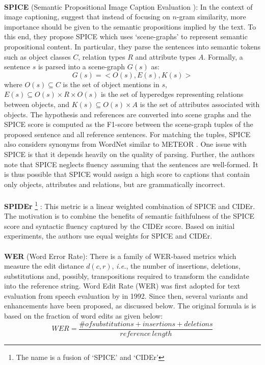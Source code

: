 \\
\textbf{SPICE} (Semantic Propositional Image Caption Evaluation  ): In the context of image captioning,  suggest that instead of focusing on $n$-gram similarity, more importance should be given to the semantic propositions implied by the text. To this end, they propose SPICE which uses `scene-graphs' to represent semantic propositional content. In particular, they parse the sentences into semantic tokens such as object classes $C$, relation types $R$ and attribute types $A$. Formally, a sentence $s$ is parsed into a scene-graph $G(s)$ as: 
$$ G(s) = <O(s), E(s), K(s)>$$
where $O(s) \subseteq C$ is the set of object mentions in $s$, $E(s) \subseteq O(s) \times R \times O(s)$ is the set of hyperedges representing relations between objects, and $K(s)\subseteq O(s) \times A$ is the set of attributes associated with objects. The hypothesis and references are converted into scene graphs and the SPICE score is computed as the F1-score between the scene-graph tuples of the proposed sentence and all reference sentences. For matching the tuples, SPICE also considers synonyms from WordNet similar to METEOR . One issue with SPICE is that it depends heavily on the quality of parsing. Further, the authors note that SPICE neglects fluency assuming that the sentences are well-formed. It is thus possible that SPICE would assign a high score to captions that contain only objects, attributes and relations, but are grammatically incorrect.\\
\\
\textbf{SPIDEr}  \footnote{The name is a fusion of `SPICE' and `CIDEr'} : This metric is a linear weighted combination of SPICE and CIDEr. The motivation is to combine the benefits of semantic faithfulness of the SPICE score and syntactic fluency captured by the CIDEr score. Based on initial experiments, the authors use equal weights for SPICE and CIDEr.\\
\\
\textbf{WER} (Word Error Rate): There is a family of WER-based metrics which measure the edit distance $d(c,r)$, \textit{i.e.}, the number of insertions, deletions, substitutions  and, possibly, transpositions required to transform the candidate into the reference string. Word Edit Rate (WER) was first adopted for text evaluation from speech evaluation by  in 1992. Since then, several variants and enhancements have been proposed, as discussed below. The original formula is is based on the fraction of word edits as given below: 
$$ WER = \frac{\# of substitutions+insertions+deletions}{reference\ length} $$
